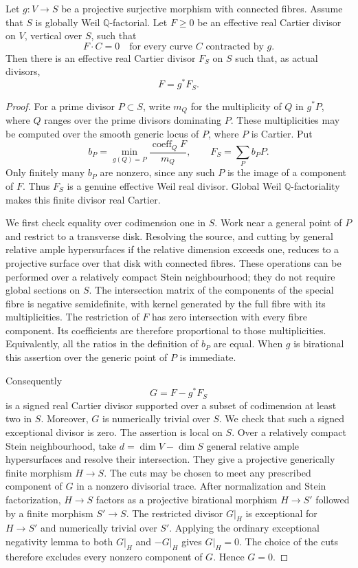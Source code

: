 \begin{lemma}
\label{prog:vertical-divisor}
Let $g:V\to S$ be a projective surjective morphism with connected fibres.
Assume that $S$ is globally Weil $\mathbb{Q}$-factorial. Let $F\geq0$ be
an effective real Cartier divisor on $V$, vertical over $S$, such that
\[
                    F\cdot C=0
       \quad\text{for every curve }C\text{ contracted by }g.
\]
Then there is an effective real Cartier divisor $F_S$ on $S$ such that,
as actual divisors,
\[
                              F=g^*F_S.
\]
\end{lemma}

\begin{proof}
For a prime divisor $P\subset S$, write $m_Q$ for the multiplicity of
$Q$ in $g^*P$, where $Q$ ranges over the prime divisors dominating $P$.
These multiplicities may be computed over the smooth generic locus of
$P$, where $P$ is Cartier. Put
\[
 b_P=\min_{g(Q)=P}\frac{\operatorname{coeff}_Q F}{m_Q},
 \qquad F_S=\sum_P b_PP.
\]
Only finitely many $b_P$ are nonzero, since any such $P$ is the image of
a component of $F$. Thus $F_S$ is a genuine effective Weil real divisor.
Global Weil $\mathbb{Q}$-factoriality makes this finite divisor real
Cartier.

We first check equality over codimension one in $S$. Work near a
general point of $P$ and restrict to a transverse disk. Resolving the
source, and cutting by general relative ample hypersurfaces if the
relative dimension exceeds one, reduces to a projective surface over
that disk with connected fibres. These operations can be performed
over a relatively compact Stein neighbourhood; they do not require
global sections on $S$. The intersection matrix of the components of
the special fibre is negative semidefinite, with kernel generated by
the full fibre with its multiplicities. The restriction of $F$ has
zero intersection with every fibre component. Its coefficients are
therefore proportional to those multiplicities. Equivalently, all the
ratios in the definition of $b_P$ are equal. When $g$ is birational this
assertion over the generic point of $P$ is immediate.

Consequently
\[
                              G=F-g^*F_S
\]
is a signed real Cartier divisor supported over a subset of codimension
at least two in $S$. Moreover, $G$ is numerically trivial over $S$.
We check that such a signed exceptional divisor is zero. The assertion
is local on $S$. Over a relatively compact Stein neighbourhood, take
$d=\dim V-\dim S$ general relative ample hypersurfaces and resolve their
intersection. They give a projective generically finite morphism
$H\to S$. The cuts may be chosen to meet any prescribed component of
$G$ in a nonzero divisorial trace. After normalization and Stein
factorization, $H\to S$ factors as a projective birational morphism
$H\to S'$ followed by a finite morphism $S'\to S$. The restricted
divisor $G|_H$ is exceptional for $H\to S'$ and numerically trivial
over $S'$. Applying the ordinary exceptional negativity lemma to both
$G|_H$ and $-G|_H$ gives $G|_H=0$. The choice of the cuts therefore
excludes every nonzero component of $G$. Hence $G=0$.


\end{proof}
